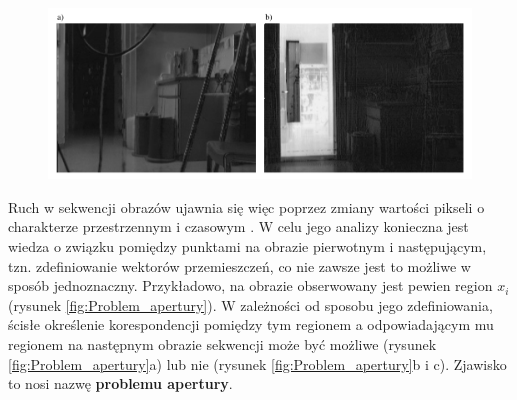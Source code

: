 \begin{figure}[!htb]
	\begin{center}
		\includegraphics[width=12cm]{images/image_difference_example.png}
	\end{center}	
\label{fig:Roznica_obrazow_przyklad}
\end{figure}

Ruch w sekwencji obrazów ujawnia się więc poprzez zmiany wartości pikseli o charakterze przestrzennym i czasowym \cite{Jaehne2005}. W celu jego analizy konieczna jest wiedza o związku pomiędzy punktami na obrazie pierwotnym i następującym, tzn. zdefiniowanie wektorów przemieszczeń, co nie zawsze jest to możliwe w sposób jednoznaczny. Przykładowo, na obrazie obserwowany jest pewien region $x_i$ (rysunek \ref{fig:Problem_apertury}). W zależności od sposobu jego zdefiniowania, ścisłe określenie korespondencji pomiędzy tym regionem a odpowiadającym mu regionem na następnym obrazie sekwencji może być możliwe (rysunek \ref{fig:Problem_apertury}a) lub nie (rysunek \ref{fig:Problem_apertury}b i c). Zjawisko to nosi nazwę \textbf{problemu apertury}.

